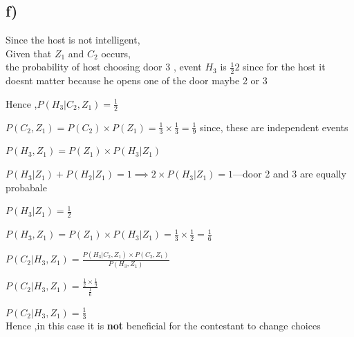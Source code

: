 \documentclass{article}
\begin{document}
\subsection*{f)}
    Since the host is not intelligent,\\
    Given that $Z_1$ and $C_2$ occurs,\\
    the probability of host choosing door 3 , event $H_3$  is $\frac{1}{2}2$ since for the host it doesnt matter because he opens one of the door maybe 2 or 3\par
    Hence ,$P(H_3|C_2,Z_1)=\frac{1}{2}$\par 
    $P(C_2,Z_1)=P(C_2)\times P(Z_1)=\frac{1}{3}\times \frac{1}{3}= \frac{1}{9}$
    since, these are independent events
    \par 
    $P(H_3,Z_1)=P(Z_1)\times P(H_3|Z_1)$
    \par 
    $P(H_3|Z_1)+P(H_2|Z_1)=1 \implies 2\times P(H_3|Z_1)=1$---door 2 and 3 are equally probabale
    \par 
    $P(H_3|Z_1)=\frac{1}{2}$
    \par
    $P(H_3,Z_1)=P(Z_1)\times P(H_3|Z_1)=\frac{1}{3}\times \frac{1}{2} =\frac{1}{6}$
    \par
    $P(C_2|H_3,Z_1)=\frac{P(H_3|C_2,Z_1)\times P(C_2,Z_1)}{P(H_3,Z_1)}$
    \par 
    $P(C_2|H_3,Z_1)=\frac{\frac{1}{2}\times\frac{1}{9}}{\frac{1}{6}}$
    \par 
    $P(C_2|H_3,Z_1)=\frac{1}{3}$
    \\
    Hence ,in this case it is \textbf{not} beneficial for the contestant to change choices
\newpage
\end{document}
